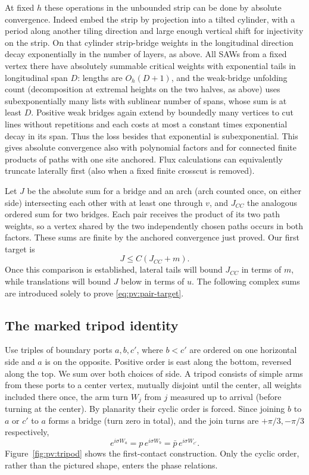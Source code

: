 At fixed \(h\) these operations in the unbounded strip can be done by absolute convergence. Indeed embed the strip by projection into a tilted cylinder, with a period along another tiling direction and large enough vertical shift for injectivity on the strip. On that cylinder strip-bridge weights in the longitudinal direction decay exponentially in the number of layers, as above. All SAWs from a fixed vertex there have absolutely summable critical weights with exponential tails in longitudinal span \(D\): lengths are \(O_h(D+1)\), and the weak-bridge unfolding count (decomposition at extremal heights on the two halves, as above) uses subexponentially many lists with sublinear number of spans, whose sum is at least \(D\). Positive weak bridges again extend by boundedly many vertices to cut lines without repetitions and each costs at most a constant times exponential decay in its span. Thus the loss besides that exponential is subexponential. This gives absolute convergence also with polynomial factors and for connected finite products of paths with one site anchored. Flux calculations can equivalently truncate laterally first (also when a fixed finite crosscut is removed).

Let \(J\) be the absolute sum for a bridge and an arch (arch counted once, on either side) intersecting each other with at least one through \(v\), and \(J_{CC}\) the analogous ordered sum for two bridges. Each pair receives the product of its two path weights, so a vertex shared by the two independently chosen paths occurs in both factors. These sums are finite by the anchored convergence just proved. Our first target is
\begin{equation}\label{eq:pv:pair-target}
 J\le C(J_{CC}+m).
\end{equation}
Once this comparison is established, lateral tails will bound $J_{CC}$ in terms of $m$, while translations will bound $J$ below in terms of $u$. The following complex sums are introduced solely to prove \eqref{eq:pv:pair-target}.

\subsection{The marked tripod identity}

Use triples of boundary ports \(a,b,c'\), where \(b<c'\) are ordered on one horizontal side and \(a\) is on the opposite. Positive order is east along the bottom, reversed along the top. We sum over both choices of side. A tripod consists of simple arms from these ports to a center vertex, mutually disjoint until the center, all weights included there once, the arm turn \(W_j\) from \(j\) measured up to arrival (before turning at the center). By planarity their cyclic order is forced. Since joining \(b\) to \(a\) or \(c'\) to \(a\) forms a bridge (turn zero in total), and the join turns are \(+\pi/3,-\pi/3\) respectively,
\[
 e^{i\sigma W_a}=p\,e^{i\sigma W_b}=\bar p\,e^{i\sigma W_{c'}}.
\]
Figure~\ref{fig:pv:tripod} shows the first-contact construction. Only the cyclic order, rather than the pictured shape, enters the phase relations.


